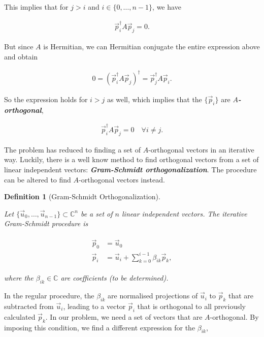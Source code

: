 \documentclass{article}
\theoremstyle{plain} %
\newtheorem{definition}{Definition}[section]
\theoremstyle{convention} %
\theoremstyle{remark} %
\def\df#1{\textbf{\textit{#1}}}
\numberwithin{equation}{section}
\begin{document}
This implies that for $j>i$ and $i \in \{0, \dots, n-1\}$, we have

\begin{align*}
    \vec{p}_i^{\dagger} A \vec{p}_j = 0.
\end{align*}

But since $A$ is Hermitian, we can Hermitian conjugate the entire expression above and obtain

\begin{align*}
    0 = \left( \vec{p}_i^{\dagger} A \vec{p}_j \right)^{\dagger} = \vec{p}_j^{\dagger} A \vec{p}_i.
\end{align*}

So the expression holds for $i>j$ as well, which implies that the $\{\vec{p}_i\}$ are \df{$A$-orthogonal},

\begin{align*}
    \vec{p}_i^{\dagger} A \vec{p}_j = 0 \quad \forall i \neq j.
\end{align*}

The problem has reduced to finding a set of $A$-orthogonal vectors in an iterative way. Luckily, there is a well know method to find orthogonal vectors from a set of linear independent vectors: \df{Gram-Schmidt orthogonalization}. The procedure can be altered to find $A$-orthogonal vectors instead.

\begin{definition}[Gram-Schmidt Orthogonalization]

\label{df:gramschmidt}

Let $\{ \vec{u}_0, \dots, \vec{u}_{n-1} \} \subset \mathbb{C}^n$ be a set of $n$ linear independent vectors. The iterative Gram-Schmidt procedure is

\begin{align}
    \begin{split}
        \vec{p}_0 &= \vec{u}_0 \label{eq:gramschmidt} \\
        \vec{p}_i &= \vec{u}_i + \sum_{k=0}^{i-1} \beta_{ik} \vec{p}_k,
    \end{split}
\end{align}

where the $\beta_{ik} \in \mathbb{C}$ are coefficients (to be determined).

\end{definition}

In the regular procedure, the $\beta_{ik}$ are normalised projections of $\vec{u}_i$ to $\vec{p}_k$ that are subtracted from $\vec{u}_i$, leading to a vector $\vec{p}_i$ that is orthogonal to all previously calculated $\vec{p}_k$. In our problem, we need a set of vectors that are $A$-orthogonal. By imposing this condition, we find a different expression for the $\beta_{ik}$,
\end{document}
